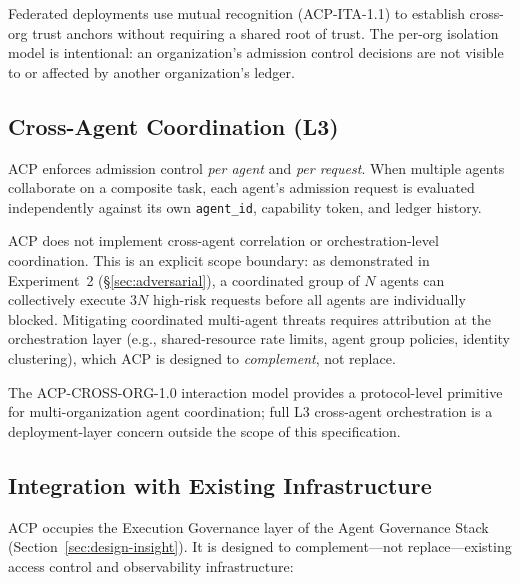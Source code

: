 \documentclass[11pt]{article}
\theoremstyle{definition}
\begin{document}
Federated deployments use mutual recognition (ACP-ITA-1.1) to establish
cross-org trust anchors without requiring a shared root of trust.
The per-org isolation model is intentional: an organization's admission control
decisions are not visible to or affected by another organization's ledger.

\subsection{Cross-Agent Coordination (L3)}

ACP enforces admission control \emph{per agent} and \emph{per request}.
When multiple agents collaborate on a composite task,
each agent's admission request is evaluated independently against its own
\texttt{agent\_id}, capability token, and ledger history.

ACP does not implement cross-agent correlation or orchestration-level coordination.
This is an explicit scope boundary: as demonstrated in Experiment~2 (§\ref{sec:adversarial}),
a coordinated group of $N$ agents can collectively execute $3N$ high-risk requests before
all agents are individually blocked.
Mitigating coordinated multi-agent threats requires attribution at the orchestration layer
(e.g., shared-resource rate limits, agent group policies, identity clustering),
which ACP is designed to \emph{complement}, not replace.

The ACP-CROSS-ORG-1.0 interaction model provides a protocol-level primitive for
multi-organization agent coordination; full L3 cross-agent orchestration is
a deployment-layer concern outside the scope of this specification.

\subsection{Integration with Existing Infrastructure}

ACP occupies the Execution Governance layer of the Agent Governance Stack
(Section~\ref{sec:design-insight}).
It is designed to complement---not replace---existing access control and
observability infrastructure:
\end{document}
